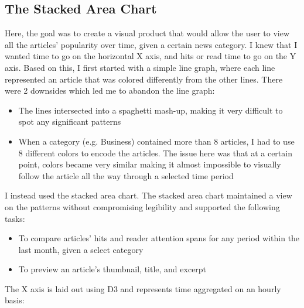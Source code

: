 \documentclass[12pt]{article}
\begin{document}
\subsection{The Stacked Area Chart}

Here, the goal was to create a visual product that would allow the user to view all the articles' popularity over time, given a certain news category. I knew that I wanted time to go on the horizontal X axis, and hits or read time to go on the Y axis. Based on this, I first started with a simple line graph, where each line represented an article that was colored differently from the other lines. There were 2 downsides which led me to abandon the line graph: 
\begin{itemize}
\item The lines intersected into a spaghetti mash-up, making it very difficult to spot any significant patterns
\item When a category (e.g. Business) contained more than 8 articles, I had to use 8 different colors to encode the articles. The issue here was that at a certain point, colors became very similar making it almost impossible to visually follow the article all the way through a selected time period 
\end{itemize}

\noindent I instead used the stacked area chart. The stacked area chart maintained a view on the patterns without compromising legibility and supported the following tasks: 
\begin{itemize}
\item To compare articles' hits and reader attention spans for any period within the last month, given a select category
\item To preview an article's thumbnail, title, and excerpt
\end{itemize}

\noindent The X axis is laid out using D3 and represents time aggregated on an hourly basis: 
\end{document}
